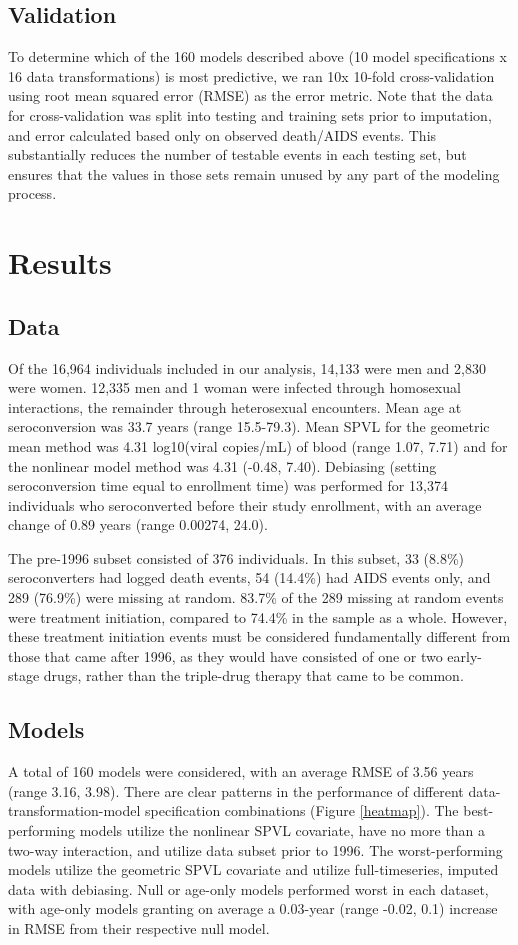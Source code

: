 \documentclass[12pt, titlepage, proquest]{article}
\begin{document}
\subsection{Validation}

To determine which of the 160 models described above (10 model specifications x 16 data transformations) is most predictive, we ran 10x 10-fold cross-validation using root mean squared error (RMSE) as the error metric. Note that the data for cross-validation was split into testing and training sets prior to imputation, and error calculated based only on observed death/AIDS events. This substantially reduces the number of testable events in each testing set, but ensures that the values in those sets remain unused by any part of the modeling process. 


\section{Results}

\subsection{Data}
Of the 16,964 individuals included in our analysis, 14,133 were men and 2,830 were women. 12,335 men and 1 woman were infected through homosexual interactions, the remainder through heterosexual encounters. Mean age at seroconversion was 33.7 years (range 15.5-79.3). Mean SPVL for the geometric mean method was 4.31 log10(viral copies/mL) of blood (range 1.07, 7.71) and for the nonlinear model method was 4.31 (-0.48, 7.40). Debiasing (setting seroconversion time equal to enrollment time) was performed for 13,374 individuals who seroconverted before their study enrollment, with an average change of 0.89 years (range 0.00274, 24.0).

The pre-1996 subset consisted of 376 individuals. In this subset, 33 (8.8\%) seroconverters had logged death events, 54 (14.4\%) had AIDS events only, and 289 (76.9\%) were missing at random.  83.7\% of the 289 missing at random events were treatment initiation, compared to 74.4\% in the sample as a whole. However, these treatment initiation events must be considered fundamentally different from those that came after 1996, as they would have consisted of one or two early-stage drugs, rather than the triple-drug therapy that came to be common.

\subsection{Models}
A total of 160 models were considered, with an average RMSE of 3.56 years (range 3.16, 3.98). There are clear patterns in the performance of different data-transformation-model specification combinations (Figure \ref{heatmap}). The best-performing models utilize the nonlinear SPVL covariate, have no more than a two-way interaction, and utilize data subset prior to 1996. The worst-performing models utilize the geometric SPVL covariate and utilize full-timeseries, imputed data with debiasing. Null or age-only models performed worst in each dataset, with age-only models granting on average a 0.03-year (range -0.02, 0.1) increase in RMSE from their respective null model.
\end{document}
